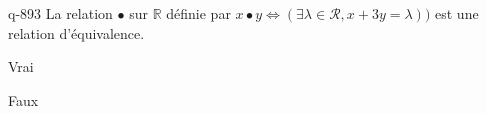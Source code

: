 \begin{truefalse}{q-893}
La relation $\bullet$ sur $\mathbb R$ définie par $x\bullet y \iff (\exists \lambda\in\mathcal R, x+3y=\lambda))$ est une relation d'équivalence.
\item* Vrai
\item Faux
\end{truefalse}

